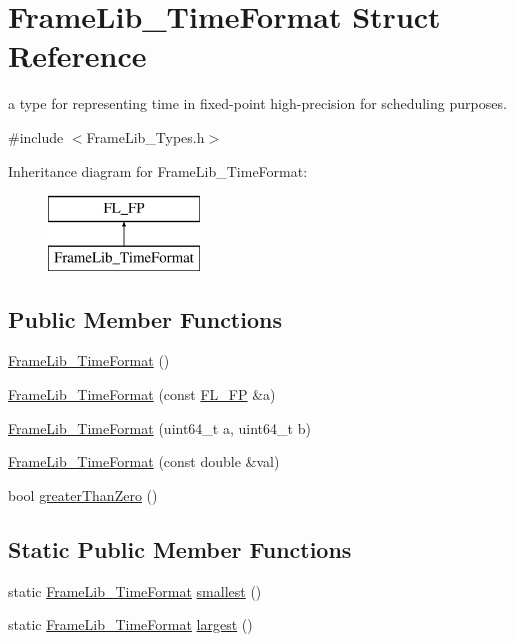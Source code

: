 \hypertarget{struct_frame_lib___time_format}{}\section{Frame\+Lib\+\_\+\+Time\+Format Struct Reference}
\label{struct_frame_lib___time_format}


a type for representing time in fixed-\/point high-\/precision for scheduling purposes.  




{\ttfamily \#include $<$Frame\+Lib\+\_\+\+Types.\+h$>$}

Inheritance diagram for Frame\+Lib\+\_\+\+Time\+Format\+:\begin{figure}[H]
\begin{center}
\leavevmode
\includegraphics[height=2.000000cm]{struct_frame_lib___time_format}
\end{center}
\end{figure}
\subsection*{Public Member Functions}
\begin{DoxyCompactItemize}
\item 
\hyperlink{struct_frame_lib___time_format_a677630f221b0bd1d705d4d0989709aaa}{Frame\+Lib\+\_\+\+Time\+Format} ()
\item 
\hyperlink{struct_frame_lib___time_format_a167df96c5ca321730c376ffd9dfdbc69}{Frame\+Lib\+\_\+\+Time\+Format} (const \hyperlink{class_f_l___f_p}{F\+L\+\_\+\+FP} \&a)
\item 
\hyperlink{struct_frame_lib___time_format_ab37fb3bec11f5da6f12058130b4ef176}{Frame\+Lib\+\_\+\+Time\+Format} (uint64\+\_\+t a, uint64\+\_\+t b)
\item 
\hyperlink{struct_frame_lib___time_format_af7cecad724454f15140304ff432093e3}{Frame\+Lib\+\_\+\+Time\+Format} (const double \&val)
\item 
bool \hyperlink{struct_frame_lib___time_format_a918dbdc989855f49cdd1154ae5dc0f9f}{greater\+Than\+Zero} ()
\end{DoxyCompactItemize}
\subsection*{Static Public Member Functions}
\begin{DoxyCompactItemize}
\item 
static \hyperlink{struct_frame_lib___time_format}{Frame\+Lib\+\_\+\+Time\+Format} \hyperlink{struct_frame_lib___time_format_af4a3f4f806589e9f2bffbca7e9c6acba}{smallest} ()
\item 
static \hyperlink{struct_frame_lib___time_format}{Frame\+Lib\+\_\+\+Time\+Format} \hyperlink{struct_frame_lib___time_format_a2f65fc07a71d9a8b4b14197cbe0d2e80}{largest} ()
\end{DoxyCompactItemize}


